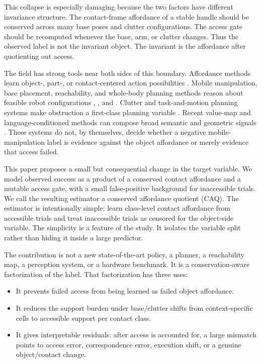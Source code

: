 \documentclass{article}
\begin{document}
This collapse is especially damaging because the two factors have different invariance structure. The contact-frame affordance of a stable handle should be conserved across many base poses and clutter configurations. The access gate should be recomputed whenever the base, arm, or clutter changes. Thus the observed label is not the invariant object. The invariant is the affordance after quotienting out access.

The field has strong tools near both sides of this boundary. Affordance methods learn object-, part-, or contact-centered action possibilities \citep{rw002,rw004,rw006,rw011,rw012,rw013,rw018,rw020,rw023,rw024,rw033,rw034,rw050,rw054,rw055}. Mobile manipulation, base placement, reachability, and whole-body planning methods reason about feasible robot configurations \citep{rw001,rw003,rw007,rw008,rw015}, \mbox{\citep{rw019}}, and \citep{rw022,rw026,rw027,rw032,rw043,rw052,rw056,rw058,rw066}. Clutter and task-and-motion planning systems make obstruction a first-class planning variable \citep{rw014,rw031,rw037,rw038}. Recent value-map and language-conditioned methods can compose broad semantic and geometric signals \citep{rw017,rw048,rw067,rw073,rw078}. These systems do not, by themselves, decide whether a negative mobile-manipulation label is evidence against the object affordance or merely evidence that access failed.

This paper proposes a small but consequential change in the target variable. We model observed success as a product of a conserved contact affordance and a mutable access gate, with a small false-positive background for inaccessible trials. We call the resulting estimator a conserved affordance quotient (CAQ). The estimator is intentionally simple: learn class-level contact affordance from accessible trials and treat inaccessible trials as censored for the object-side variable. The simplicity is a feature of the study. It isolates the variable split rather than hiding it inside a large predictor.

The contribution is not a new state-of-the-art policy, a planner, a reachability map, a perception system, or a hardware benchmark. It is a conservation-aware factorization of the label. That factorization has three uses:

\begin{itemize}
    \item It prevents failed access from being learned as failed object affordance.
    \item It reduces the support burden under base/clutter shifts from context-specific cells to accessible support per contact class.
    \item It gives interpretable residuals: after access is accounted for, a large mismatch points to access error, correspondence error, execution shift, or a genuine object/contact change.
\end{itemize}
\end{document}
